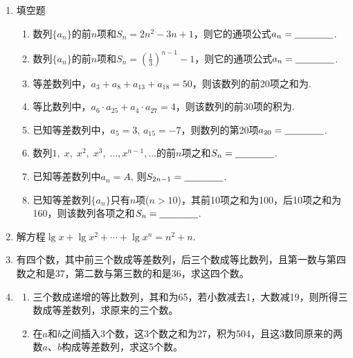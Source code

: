 \begin{enumerate}
\begin{enumerate}[(1)]
\item 等差数列$\{a_n\}$，$\{b_n\}$的前$n$项和分别为$S_n$与$T_n$，若$\frac{S_n}{T_n}=\frac{2n}{3n+1}$，则
$\Lim{n}{\infty}\frac{a_n}{b_n}$等于（\qquad ）
\begin{multicols}{4}
\begin{enumerate}[(A)]
    \item 1
    \item $\frac{6}{3}$
    \item $\frac{2}{3}$
    \item $\frac{4}{9}$
\end{enumerate}
\end{multicols}

\end{enumerate}


\item     填空题
\begin{enumerate}[(1)]
    \item 数列$\{a_n\}$的前$n$项和$S_n=2n^2-3n+1$，则它的通项公式$a_n=\underline{\qquad}\underline{\qquad}$.
    \item 数列$\{a_n\}$的前$n$项和$S_n=\left(\frac{1}{3}\right)^{n-1}-1$，则它的通项公式$a_n=\underline{\qquad}\underline{\qquad}$.
    \item 等差数列中，$a_3+a_8+a_{13}+a_{18}=50$，则该数列的前20项之和为\blank\blank.
    \item 等比数列中，$a_6\cdot a_{25}+a_4\cdot a_{27}=4$，则该数列的前30项的积为\blank\blank.
    \item  已知等差数列中，$a_5=3$, $a_{15}=-7$，则数列的第20项$a_{20}=\underline{\qquad}\underline{\qquad}$.
    \item  数列$1,\; x,\; x^2,\;x^3,\;\ldots, x^{n-1},\ldots$的前$n$项之和$S_n=\underline{\qquad}\underline{\qquad}$.
    \item 已知等差数列中$a_n=A$, 则$S_{2n-1}=\underline{\qquad}\underline{\qquad}$.
    \item 已知等差数列$\{a_n\}$只有$n$项($n>10$)，其前10项之和为100，后10项之和为160，则该数列各项之和$S_n=\underline{\qquad}\underline{\qquad}$.
\end{enumerate}
   
\item 解方程$\lg x+\lg x^2+\cdots+ \lg x^n=n^2+n$.

\item 有四个数，其中前三个数成等差数列，后三个数成等比数列，且第一数与第四数之和是37，第二数与第三数的和是36，求这四个数。
\item 
\begin{enumerate}[(1)]
 \item 三个数成递增的等比数列，其和为65，若小数减去1，大数减19，则所得三数成等差数列，求原来的三个数。
\item 在$a$和$b$之间插入3个数，这3个数之和为27，积为504，且这3数同原来的两数$a$、$b$构成等差数列，求这5个数。
\end{enumerate}


\end{enumerate}
